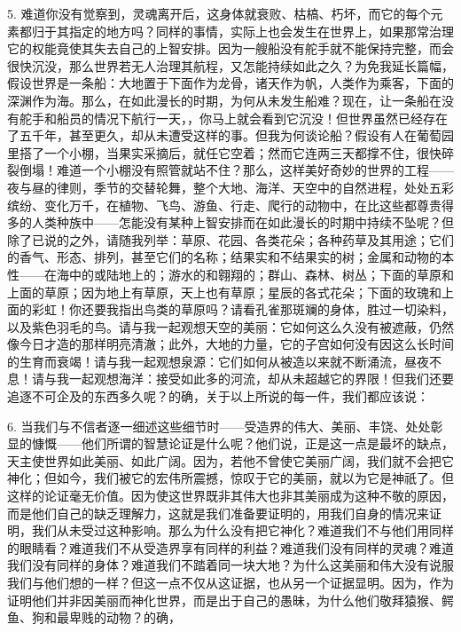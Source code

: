5. 难道你没有觉察到，灵魂离开后，这身体就衰败、枯槁、朽坏，而它的每个元素都归于其指定的地方吗？同样的事情，实际上也会发生在世界上，如果那常治理它的权能竟使其失去自己的上智安排。因为一艘船没有舵手就不能保持完整，而会很快沉没，那么世界若无人治理其航程，又怎能持续如此之久？为免我延长篇幅，假设世界是一条船：大地置于下面作为龙骨，诸天作为帆，人类作为乘客，下面的深渊作为海。那么，在如此漫长的时期，为何从未发生船难？现在，让一条船在没有舵手和船员的情况下航行一天，，你马上就会看到它沉没！但世界虽然已经存在了五千年，甚至更久，却从未遭受这样的事。但我为何谈论船？假设有人在葡萄园里搭了一个小棚，当果实采摘后，就任它空着；然而它连两三天都撑不住，很快碎裂倒塌！难道一个小棚没有照管就站不住？那么，这样美好奇妙的世界的工程——夜与昼的律则，季节的交替轮舞，整个大地、海洋、天空中的自然进程，处处五彩缤纷、变化万千，在植物、飞鸟、游鱼、行走、爬行的动物中，在比这些都尊贵得多的人类种族中——怎能没有某种上智安排而在如此漫长的时期中持续不坠呢？但除了已说的之外，请随我列举：草原、花园、各类花朵；各种药草及其用途；它们的香气、形态、排列，甚至它们的名称；结果实和不结果实的树；金属和动物的本性——在海中的或陆地上的；游水的和翱翔的；群山、森林、树丛；下面的草原和上面的草原；因为地上有草原，天上也有草原；星辰的各式花朵；下面的玫瑰和上面的彩虹！你还要我指出鸟类的草原吗？请看孔雀那斑斓的身体，胜过一切染料，以及紫色羽毛的鸟。请与我一起观想天空的美丽：它如何这么久没有被遮蔽，仍然像今日才造的那样明亮清澈；此外，大地的力量，它的子宫如何没有因这么长时间的生育而衰竭！请与我一起观想泉源：它们如何从被造以来就不断涌流，昼夜不息！请与我一起观想海洋：接受如此多的河流，却从未超越它的界限！但我们还要追逐不可企及的东西多久呢？的确，关于以上所说的每一件，我们都应该说：\par

6. 当我们与不信者逐一细述这些细节时——受造界的伟大、美丽、丰饶、处处彰显的慷慨——他们所谓的智慧论证是什么呢？他们说，正是这一点是最坏的缺点，天主使世界如此美丽、如此广阔。因为，若他不曾使它美丽广阔，我们就不会把它神化；但如今，我们被它的宏伟所震撼，惊叹于它的美丽，就以为它是神祇了。但这样的论证毫无价值。因为使这世界既非其伟大也非其美丽成为这种不敬的原因，而是他们自己的缺乏理解力，这就是我们准备要证明的，用我们自身的情况来证明，我们从未受过这种影响。那么为什么没有把它神化？难道我们不与他们用同样的眼睛看？难道我们不从受造界享有同样的利益？难道我们没有同样的灵魂？难道我们没有同样的身体？难道我们不踏着同一块大地？为什么这美丽和伟大没有说服我们与他们想的一样？但这一点不仅从这证据，也从另一个证据显明。因为，作为证明他们并非因美丽而神化世界，而是出于自己的愚昧，为什么他们敬拜猿猴、鳄鱼、狗和最卑贱的动物？的确，\par

